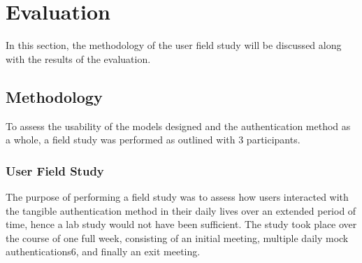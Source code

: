 \documentclass{l4proj}
\begin{document}
\chapter{Evaluation}

In this section, the methodology of the user field study will be discussed along with the results of the evaluation.

\section{Methodology}

To assess the usability of the models designed and the authentication method as a whole, a field study was performed as outlined with 3 participants.

\subsection{User Field Study}

The purpose of performing a field study was to assess how users interacted with the tangible authentication method in their daily lives over an extended period of time, hence a lab study would not have been sufficient. The study took place over the course of one full week, consisting of an initial meeting, multiple daily mock authentications6, and finally an exit meeting.
\end{document}
